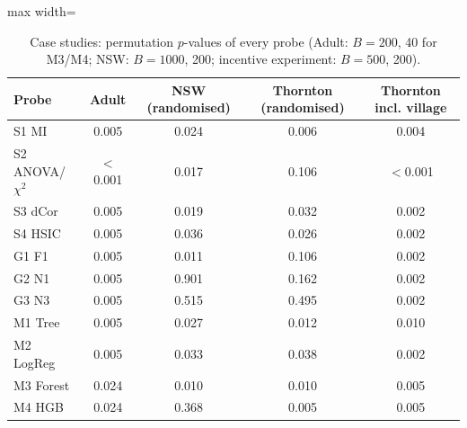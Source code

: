 \begin{table}[!t]
\centering
\caption{Case studies: permutation $p$-values of every probe (Adult: $B=200$, 40 for M3/M4; NSW: $B=1000$, 200; incentive experiment: $B=500$, 200).}
\label{tab:cases}
\footnotesize
\begin{adjustbox}{max width=\linewidth}
\begin{tabular}{lcccc}
\hline
Probe & Adult & NSW (randomised) & Thornton (randomised) & Thornton incl. village \\ \hline
S1 MI & 0.005 & 0.024 & 0.006 & 0.004 \\
S2 ANOVA/$\chi^2$ & $<$0.001 & 0.017 & 0.106 & $<$0.001 \\
S3 dCor & 0.005 & 0.019 & 0.032 & 0.002 \\
S4 HSIC & 0.005 & 0.036 & 0.026 & 0.002 \\
G1 F1 & 0.005 & 0.011 & 0.106 & 0.002 \\
G2 N1 & 0.005 & 0.901 & 0.162 & 0.002 \\
G3 N3 & 0.005 & 0.515 & 0.495 & 0.002 \\
M1 Tree & 0.005 & 0.027 & 0.012 & 0.010 \\
M2 LogReg & 0.005 & 0.033 & 0.038 & 0.002 \\
M3 Forest & 0.024 & 0.010 & 0.010 & 0.005 \\
M4 HGB & 0.024 & 0.368 & 0.005 & 0.005 \\
\hline
\end{tabular}
\end{adjustbox}
\end{table}
